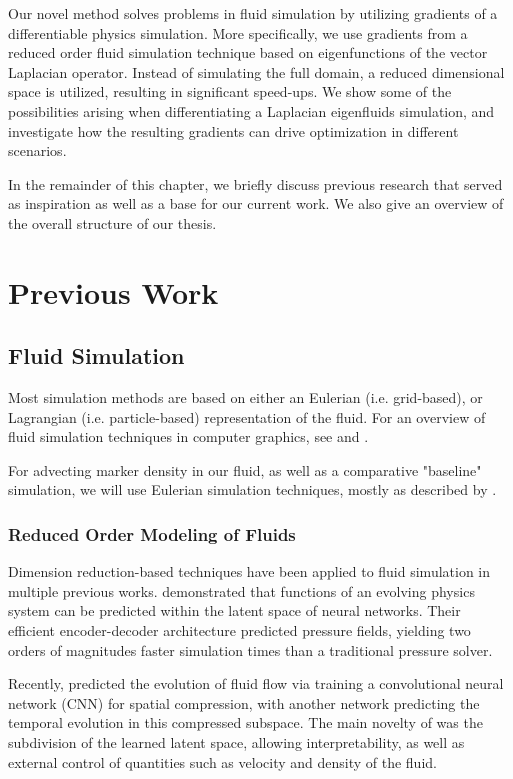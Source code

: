 Our novel method solves problems in fluid simulation by utilizing gradients of
a differentiable physics simulation. More specifically, we use gradients from
a reduced order fluid simulation technique based on eigenfunctions of the vector
Laplacian operator. Instead of simulating the full domain, a reduced dimensional
space is utilized, resulting in significant speed-ups. We show some of the
possibilities arising when differentiating a Laplacian eigenfluids simulation,
and investigate how the resulting gradients can drive optimization in different
scenarios.

In the remainder of this chapter, we briefly discuss previous research that
served as inspiration as well as a base for our current work. We also give an
overview of the overall structure of our thesis. 

\section{Previous Work}
\subsection{Fluid Simulation}
Most simulation methods are based on either an Eulerian (i.e.  grid-based), or
Lagrangian (i.e. particle-based) representation of the fluid.  For an overview
of fluid simulation techniques in computer graphics, see \citet{FluidNotes} and
\citet{BridsonFluid}. 

For advecting marker density in our fluid, as well as a comparative "baseline"
simulation, we will use Eulerian simulation techniques, mostly as described by
\citet{StableFluids}.

\subsubsection*{Reduced Order Modeling of Fluids}
Dimension reduction-based techniques have been applied to fluid simulation in
multiple previous works. \citet{Wiewel2019LatentSP} demonstrated that functions
of an evolving physics system can be predicted within the latent space of neural
networks. Their efficient encoder-decoder architecture predicted pressure
fields, yielding two orders of magnitudes faster simulation times than
a traditional pressure solver.

Recently, \citet{LatentSpaceSubdivision} predicted the
evolution of fluid flow via training a convolutional neural network (CNN) for
spatial compression, with another network predicting the temporal evolution in
this compressed subspace.  The main novelty of \cite{LatentSpaceSubdivision} was
the subdivision of the learned latent space, allowing interpretability, as well
as external control of quantities such as velocity and density of the fluid.

